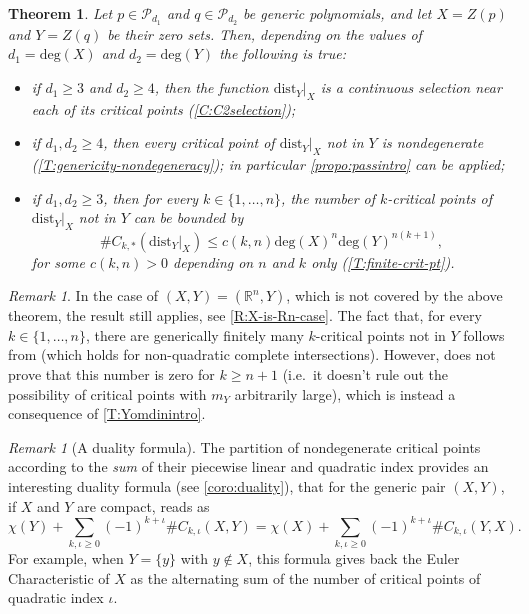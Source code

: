 \documentclass{amsart}
\newcommand{\R}{\mathbb{R}}
\newcommand{\dist}{{\mathrm{dist}_Y|_X}}
\newcommand{\Poly}{\mathscr{P}}
\def\lini{k}
\def\quadi{\iota}
\newtheorem{theorem}[subsubsection]{Theorem}
\theoremstyle{definition}
\theoremstyle{remark}
\newtheorem{remark}[subsubsection]{Remark}
\newcommand{\be}{\begin{equation}}
\newcommand{\ee}{\end{equation}}
\begin{document}
\begin{theorem}
\label{T:finite-crit-ptintro}
Let $p \in \Poly_{d_1}$ and $q\in \Poly_{d_2}$ be generic polynomials, and let $X = Z(p)$ and $Y = Z(q)$ be their zero sets. Then, depending on the values of $d_1=\mathrm{deg}(X)$ and $d_2=\mathrm{deg}(Y)$ the following is true:
\begin{itemize}
\item[-] if $d_1 \geq 3$ and $d_2 \geq 4$, then the function $\dist$ is a continuous selection near each of its critical points (\cref{C:C2selection});
\item[-] if $d_1, d_2 \geq 4$, then every critical point of $\dist$ not in $Y$ is nondegenerate (\cref{T:genericity-nondegeneracy}); in particular \cref{propo:passintro} can be applied;
\item[-] if $d_1, d_2 \geq 3$, then for every $k\in \{1, \ldots, n\}$, the number of $\lini$-critical points of $\dist$ not in $Y$ can be bounded by
\be\label{eq:boundcriticalintro}\#C_{\lini, *}(\dist)\leq c(k,n)\mathrm{deg}(X)^n\mathrm{deg}(Y)^{n(k+1)},\ee
for some $c(k,n)>0$ depending on $n$ and $k$ only (\cref{T:finite-crit-pt}).
\end{itemize}
\end{theorem}

\begin{remark}
In the case of $(X, Y) = (\R^n, Y)$, which is not covered by the above theorem,  the result still applies, see \cref{R:X-is-Rn-case}. The fact that, for every $k \in \{1, \ldots, n\}$, there are generically finitely many $k$-critical points not in $Y$ follows from \cite[Theorem 4.14]{DEEGH2023} (which holds for non-quadratic complete intersections). However, \cite[Theorem 4.14]{DEEGH2023} does not prove that this number is zero for $k\ge n+1$ (i.e.\ it doesn't rule out the possibility of critical points with $m_Y$ arbitrarily large), which is instead a consequence of \cref{T:Yomdinintro}. 
\end{remark}

\begin{remark}[A duality formula]
The partition of nondegenerate critical points according to the \emph{sum} of their piecewise linear and quadratic index provides an interesting duality formula (see \cref{coro:duality}), that for the generic pair $(X, Y)$, if $X$ and $Y$ are compact, reads as
\[
\chi(Y)+\sum_{\lini, \quadi\geq 0}(-1)^{\lini + \quadi}\#C_{\lini, \quadi}(X, Y)=\chi(X)+\sum_{\lini, \quadi\geq 0}(-1)^{\lini + \quadi}\#C_{\lini, \quadi}(Y, X).
\]
For example, when $Y=\{y\}$ with $y \notin X$, this formula gives back the Euler Characteristic of $X$ as the alternating sum of the number of critical points of quadratic index $\quadi$.
\end{remark}
\end{document}
